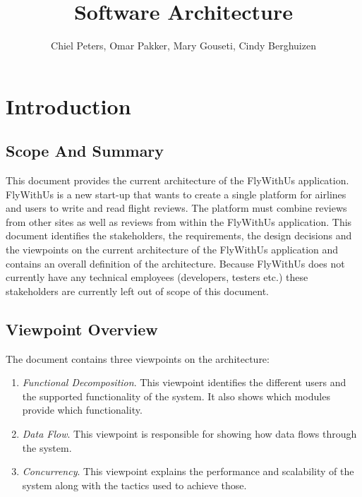 \documentclass{article}
\begin{document}
\title{Software Architecture}
\author{Chiel Peters, Omar Pakker, Mary Gouseti, Cindy Berghuizen}
\maketitle

\setlength\parindent{0pt}

\section{Introduction}
\subsection{Scope And Summary}
This document provides the current architecture of the FlyWithUs application. FlyWithUs is a new start-up that wants to create a single platform for airlines and users to write and read flight reviews. The platform must combine reviews from other sites as well as reviews from within the FlyWithUs application.
This document identifies the stakeholders, the  requirements, the design decisions and the viewpoints on the current architecture of the FlyWithUs application and contains an overall definition of the architecture. Because FlyWithUs does not currently have any technical employees (developers, testers etc.) these stakeholders are currently left out of scope of this document.
 
\subsection{Viewpoint Overview}
The document contains three viewpoints on the architecture:
\begin{enumerate}
\item \emph{Functional Decomposition}. This viewpoint identifies the different users and the supported functionality of the system. It also shows which modules provide which functionality.
\item \emph{Data Flow}. This viewpoint is responsible for showing how data flows through the system.
\item \emph{Concurrency}. This viewpoint explains the performance and scalability of the system along with the tactics used to achieve those.
\end{enumerate}
 
\end{document}
